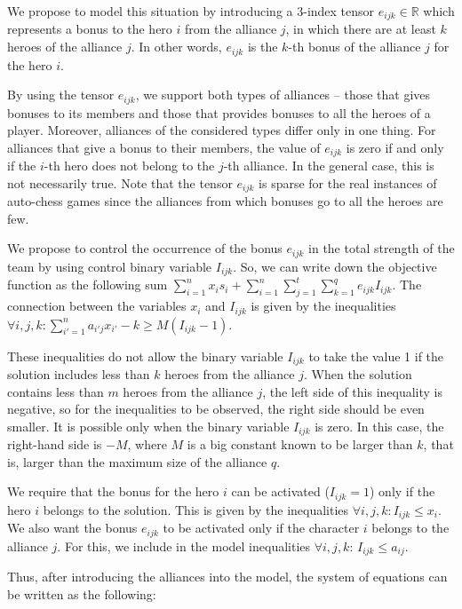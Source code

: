 \documentclass[smallextended]{svjour3}       %
\begin{document}
We propose to model this situation by introducing a 3-index tensor $ e_{ijk} \in \mathbb{R} $ which represents a bonus to the hero $i$ from the alliance $j$, in which there are at least $k$ heroes of the alliance $j$. In other words, $ e_{ijk} $ is the $k$-th bonus of the alliance $ j$ for the hero $i$.

By using the tensor $e_{ijk} $, we support both types of alliances -- those that gives bonuses to its members and those that provides bonuses to all the heroes of a player. Moreover, alliances of the considered types differ only in one thing. For alliances that give a bonus to their members, the value of $e_{ijk} $ is zero if and only if the $i$-th hero does not belong to the $j$-th alliance. In the general case, this is not necessarily true. Note that the tensor $ e_{ijk} $ is sparse for the real instances of auto-chess games since the alliances from which bonuses go to all the heroes are few.

We propose to control the occurrence of the bonus $ e_{ijk} $ in the total strength of the team by using control binary variable $ I_{ijk} $.
So, we can write down the objective function as the following sum $ \sum_{i = 1}^{n} x_i s_i + \sum_{i=1}^{n} \sum_{j=1}^{t}  \sum_{k=1}^{q} e_{ijk} I_{ijk} $.
The connection between the variables $ x_{i} $ and $ I_{ijk} $ is given by the inequalities
$\forall{i,j,k} :  \sum_{i'=1}^{n} a_{i'j} x_{i'} - k \ge M( I_{ijk} - 1)$. 

These inequalities do not allow the binary variable $ I_{ijk} $ to take the value 1 if the solution includes less than $k$ heroes from the alliance $j$. When the solution contains less than $m$ heroes from the alliance $j$, the left side of this inequality is negative, so for the inequalities to be observed, the right side should be even smaller. It is possible only when the binary variable $ I_{ijk} $ is zero. In this case, the right-hand side is $-M $, where $M$ is a big constant known to be larger than $k$, that is, larger than the maximum size of the alliance $q$.

We require that the bonus for the hero $i$ can be activated ($ I_{ijk} = 1 $) only if the hero $i$ belongs to the solution. This is given by the inequalities $ \forall {i, j, k}: I_{ijk} \le x_i $. We also want the bonus $ e_{ijk} $ to be activated only if the character $ i $ belongs to the alliance $j$. For this, we include in the model inequalities $ \forall{i, j, k} :\, I_{ijk} \le a_{ij} $.

Thus, after introducing the alliances into the model, the system of equations can be written as the following:
\end{document}
